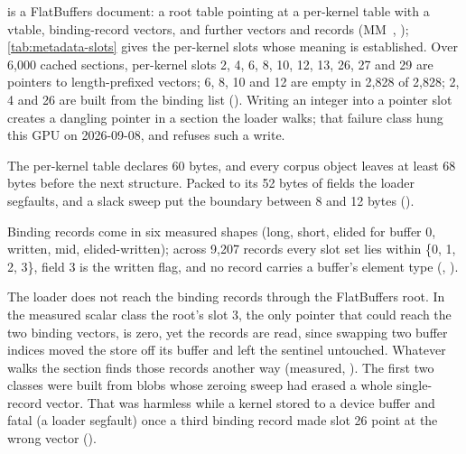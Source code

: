  is a FlatBuffers document: a root table pointing at a per-kernel table with a vtable,
binding-record vectors, and further vectors and records (MM~, ); \cref{tab:metadata-slots}
gives the per-kernel slots whose meaning is established. Over 6,000 cached sections,
per-kernel slots 2, 4, 6, 8, 10, 12, 13, 26, 27 and 29 are pointers to length-prefixed vectors; 6, 8, 10 and 12 are empty
in 2,828 of 2,828; 2, 4 and 26 are built from the binding list (). Writing an integer into a
pointer slot creates a dangling pointer in a section the loader walks; that failure class hung this GPU on 2026-09-08,
and  refuses such a write.

The per-kernel table declares 60 bytes, and every corpus object leaves at least 68 bytes before the next structure.
Packed to its 52 bytes of fields the loader segfaults, and a slack sweep put the boundary between 8 and 12 bytes
().

Binding records come in six measured shapes (long, short,
elided for buffer 0, written, mid, elided-written); across 9,207 records every slot set lies within \{0, 1, 2, 3\}, field 3
is the written flag, and no record carries a buffer's element type
(, ).

The loader does not reach the binding records through the FlatBuffers root. In the measured scalar class the root's slot 3, the
only pointer that could reach the two binding vectors, is zero, yet the records are read, since swapping two buffer indices
moved the store off its buffer and left the sentinel untouched. Whatever walks the section finds those records another
way (measured, ). The
first two classes were built from blobs whose zeroing sweep had erased a whole single-record vector. That was harmless
while a kernel stored to a device buffer and fatal (a loader segfault) once a third binding record made slot 26 point at
the wrong vector ().


